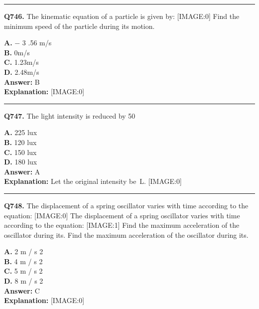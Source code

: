 \documentclass[12pt]{article}
\begin{document}
\hrule
\vspace{1em}


\noindent
\textbf{Q746.} The kinematic equation of a particle is given by:
[IMAGE:0]
Find the minimum speed of the particle during its motion.



\textbf{A.} −
3
.56
m/s \\
\textbf{B.} 0m/s \\
\textbf{C.} 1.23m/s \\
\textbf{D.} 2.48m/s \\

\textbf{Answer:} B \\
\textbf{Explanation:} [IMAGE:0]

\hrule
\vspace{1em}


\noindent
\textbf{Q747.} The light intensity is reduced by 50%



\textbf{A.} 225 lux \\
\textbf{B.} 120 lux \\
\textbf{C.} 150 lux \\
\textbf{D.} 180 lux \\

\textbf{Answer:} A \\
\textbf{Explanation:} Let the original intensity be L.
[IMAGE:0]

\hrule
\vspace{1em}


\noindent
\textbf{Q748.} The displacement of a spring oscillator varies with time according to the equation:
[IMAGE:0]
The displacement of a spring oscillator varies with time according to the equation:
[IMAGE:1]
Find the maximum acceleration of the oscillator during its.
Find the maximum acceleration of the oscillator during its.



\textbf{A.} 2
m
/
s
2 \\
\textbf{B.} 4
m
/
s
2 \\
\textbf{C.} 5
m
/
s
2 \\
\textbf{D.} 8
m
/
s
2 \\

\textbf{Answer:} C \\
\textbf{Explanation:} [IMAGE:0]
\end{document}
